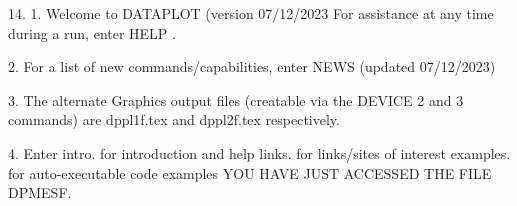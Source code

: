 14.
1. Welcome to DATAPLOT (version 07/12/2023  For assistance at
   any time during a run, enter HELP   .

2. For a list of new commands/capabilities,
   enter NEWS  (updated 07/12/2023)

3. The alternate Graphics output files (creatable
   via the DEVICE 2 and 3 commands) are
   dppl1f.tex and dppl2f.tex respectively.

4. Enter  intro.     for introduction and help
          links.     for links/sites of interest
          examples.  for auto-executable code examples
YOU HAVE JUST ACCESSED THE FILE DPMESF.
